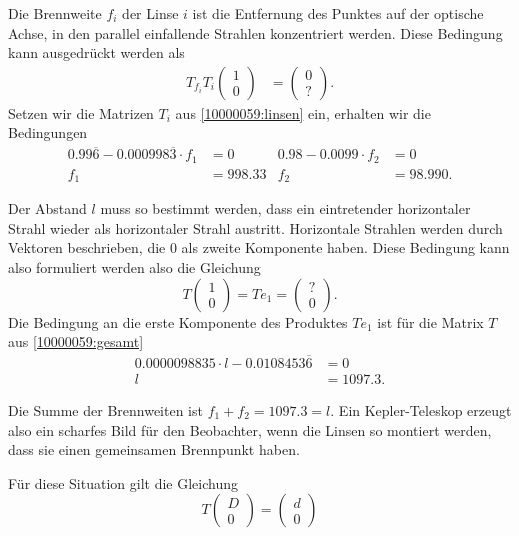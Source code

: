 \begin{loesung}
\begin{teilaufgaben}
\item 
Die Brennweite $f_i$ der Linse $i$ ist die Entfernung des Punktes auf
der optische Achse, in den parallel einfallende Strahlen konzentriert werden.
Diese Bedingung kann ausgedrückt werden als
\begin{align*}
T_{f_i} T_i\begin{pmatrix}1\\0\end{pmatrix} &= \begin{pmatrix} 0\\?\end{pmatrix}.
\end{align*}
Setzen wir die Matrizen $T_i$ aus \eqref{10000059:linsen} ein, erhalten wir
die Bedingungen
\begin{align*}
0.99\overline{6} - 0.000998\overline{3}\cdot f_1 &= 0
&
0.98 - 0.0099\cdot f_2 &= 0
\\
f_1 &= 998.33
&
f_2 &= 98.990.
\end{align*}
\item
Der Abstand $l$ muss so bestimmt werden, dass ein eintretender horizontaler
Strahl wieder als horizontaler Strahl austritt.
Horizontale Strahlen werden durch Vektoren beschrieben, die $0$ als
zweite Komponente haben.
Diese Bedingung kann also formuliert werden also die Gleichung
\[
T\begin{pmatrix}1\\0\end{pmatrix} = Te_1 = \begin{pmatrix}?\\0\end{pmatrix}.
\]
Die Bedingung an die erste Komponente des Produktes $Te_1$ ist für die
Matrix $T$ aus \eqref{10000059:gesamt}
\begin{align*}
0.0000098835\cdot l - 0.0108453\overline{6} &= 0
\\
l&=1097.3.
\end{align*}
\item
Die Summe der Brennweiten ist $f_1+f_2 = 1097.3 = l$.
Ein Kepler-Teleskop erzeugt also ein scharfes Bild für den Beobachter,
wenn die Linsen so montiert werden, dass sie einen gemeinsamen
Brennpunkt haben.
\item
Für diese Situation gilt die Gleichung
\[
T\begin{pmatrix}D\\0\end{pmatrix}=\begin{pmatrix}d\\0\end{pmatrix}
\]
\end{teilaufgaben}
\end{loesung}

